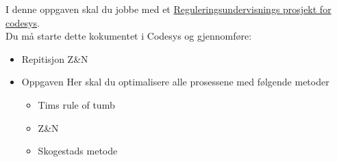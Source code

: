 

I denne oppgaven skal du jobbe med et \href{https://rfka-my.sharepoint.com/:u:/g/personal/fred-olav_mosdal_skole_rogfk_no/EdYP_MBtF1hIv2zqvzwtseMBLPwboQBdzCetAxSY83kwLw?e=PAZiw7}{Reguleringsundervisnings prosjekt for codesys}. \\

Du må starte dette kokumentet i Codesys og gjennomføre:
\begin{itemize}[noitemsep]
\item Repitisjon Z\&N
\item Oppgaven Her skal du optimalisere alle prosessene med følgende metoder
\begin{itemize}[noitemsep]
\item Tims rule of tumb
\item Z\&N
\item Skogestads metode
\end{itemize}


\end{itemize}






















